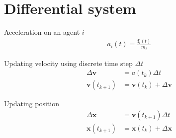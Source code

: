 \section{Differential system}
Acceleration on an agent $ i $
\begin{align}
a_{i}(t) = \frac{\mathbf{f}_{i}(t)}{m_{i}}
\end{align}

Updating velocity using discrete time step $ \Delta t $
\begin{align}
\Delta \mathbf{v} &= a(t_{k}) \Delta t \\
\mathbf{v}(t_{k+1}) &= \mathbf{v}(t_{k}) + \Delta \mathbf{v}
\end{align}

Updating position
\begin{align}
\Delta \mathbf{x} &= \mathbf{v}(t_{k+1}) \Delta t \\
\mathbf{x}(t_{k+1}) &= \mathbf{x}(t_{k}) + \Delta \mathbf{x}
\end{align}
